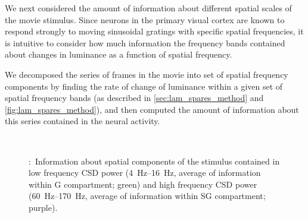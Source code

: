 We next considered the amount of information about different spatial scales of the movie stimulus.
Since neurons in the primary visual cortex are known to respond strongly to moving sinusoidal gratings with specific spatial frequencies, it is intuitive to consider how much information the frequency bands contained about changes in luminance as a function of spatial frequency.

We decomposed the series of frames in the movie into set of spatial frequency components by finding the rate of change of luminance within a given set of spatial frequency bands (as described in \autoref{sec:lam_spares_method} and \autoref{fig:lam_spares_method}), and then computed the amount of information about this series contained in the neural activity.

\begin{figure}[htbp]
    \centering
    \hspace*{\fill}
    \hspace*{\fill}\hspace{.2cm}\hspace*{\fill}
    \hspace*{\fill}
    \\
    \hspace*{\fill}
    \hspace*{\fill}\hspace{.2cm}\hspace*{\fill}
    \hspace*{\fill}
%
\caption{
\protect{}:~Information about spatial components of the stimulus contained in low frequency \ac{CSD} power (\SIrange{4}{16}{Hz}, average of information within \ac{G} compartment; green) and high frequency \ac{CSD} power (\SIrange{60}{170}{Hz}, average of information within \ac{SG} compartment; purple).
}
\end{figure}
